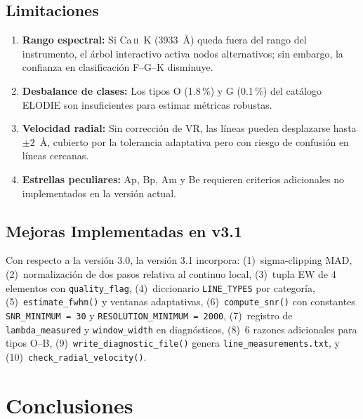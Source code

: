 \documentclass[12pt,a4paper]{article}
\begin{document}
\subsection{Limitaciones}

\begin{enumerate}
  \item \textbf{Rango espectral:} Si Ca\,\textsc{ii}~K (3933~Å) queda fuera del
        rango del instrumento, el árbol interactivo activa nodos alternativos; sin
        embargo, la confianza en clasificación F--G--K disminuye.
  \item \textbf{Desbalance de clases:} Los tipos O (1.8\,\%) y G (0.1\,\%) del
        catálogo ELODIE son insuficientes para estimar métricas robustas.
  \item \textbf{Velocidad radial:} Sin corrección de VR, las líneas pueden desplazarse
        hasta $\pm 2$~Å, cubierto por la tolerancia adaptativa pero con riesgo de
        confusión en líneas cercanas.
  \item \textbf{Estrellas peculiares:} Ap, Bp, Am y Be requieren criterios adicionales
        no implementados en la versión actual.
\end{enumerate}

\subsection{Mejoras Implementadas en v3.1}

Con respecto a la versión 3.0, la versión 3.1 incorpora: (1)~sigma-clipping MAD,
(2)~normalización de dos pasos relativa al continuo local, (3)~tupla EW de 4 elementos
con \texttt{quality\_flag}, (4)~diccionario \texttt{LINE\_TYPES} por categoría,
(5)~\texttt{estimate\_fwhm()} y ventanas adaptativas, (6)~\texttt{compute\_snr()} con
constantes \texttt{SNR\_MINIMUM = 30} y \texttt{RESOLUTION\_MINIMUM = 2000},
(7)~registro de \texttt{lambda\_measured} y \texttt{window\_width} en diagnósticos,
(8)~6 razones adicionales para tipos O--B, (9)~\texttt{write\_diagnostic\_file()}
genera \texttt{line\_measurements.txt}, y (10)~\texttt{check\_radial\_velocity()}.

\section{Conclusiones}
\end{document}
